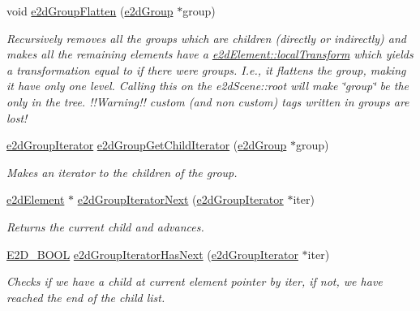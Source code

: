 \begin{DoxyCompactItemize}
void \hyperlink{group__e2d_group_gafa65ab615b8a0c181a2d5b88eed9fa16}{e2d\-Group\-Flatten} (\hyperlink{structe2d_group}{e2d\-Group} $\ast$group)
\begin{DoxyCompactList}\small\item\em Recursively removes all the groups which are children (directly or indirectly) and makes all the remaining elements have a \hyperlink{structe2d_element_a52bda732df714953f93c1e6f5f7c7c93}{e2d\-Element\-::local\-Transform} which yields a transformation equal to if there were groups. I.\-e., it flattens the group, making it have only one level. Calling this on the e2d\-Scene\-::root will make \char`\"{}group\char`\"{} be the only in the tree. !!\-Warning!! custom (and non custom) tags written in groups are lost! \end{DoxyCompactList}\item 
\hyperlink{structe2d_group_iterator}{e2d\-Group\-Iterator} \hyperlink{group__e2d_group_gaf5a7338c446192338b764a7ac89371d5}{e2d\-Group\-Get\-Child\-Iterator} (\hyperlink{structe2d_group}{e2d\-Group} $\ast$group)
\begin{DoxyCompactList}\small\item\em Makes an iterator to the children of the group. \end{DoxyCompactList}\item 
\hyperlink{structe2d_element}{e2d\-Element} $\ast$ \hyperlink{group__e2d_group_gaa5ffe3eb2b83f318df4f22272f1e1189}{e2d\-Group\-Iterator\-Next} (\hyperlink{structe2d_group_iterator}{e2d\-Group\-Iterator} $\ast$iter)
\begin{DoxyCompactList}\small\item\em Returns the current child and advances. \end{DoxyCompactList}\item 
\hyperlink{_ez2_d_s_8h_aac8cdc3a3bcd6b56a8c3e0bb6979cbf8}{E2\-D\-\_\-\-B\-O\-O\-L} \hyperlink{group__e2d_group_ga493d54c28198410762cfa32c97d8e646}{e2d\-Group\-Iterator\-Has\-Next} (\hyperlink{structe2d_group_iterator}{e2d\-Group\-Iterator} $\ast$iter)
\begin{DoxyCompactList}\small\item\em Checks if we have a child at current element pointer by iter, if not, we have reached the end of the child list. \end{DoxyCompactList}\end{DoxyCompactItemize}


